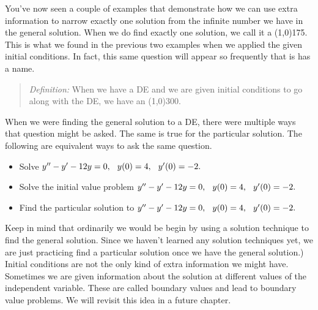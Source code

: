 \documentclass[12pt]{article}
\newcommand{\<}{\langle}
\renewcommand{\>}{\rangle}
\begin{document}
\newpage
	
\noindent  You've now seen a couple of examples that demonstrate how we can use extra information
to narrow exactly one solution from the infinite number we have in the general solution.  When we do
find exactly one solution, we call it a %
\line(1,0){175}.  This is what we found in the previous
two examples when we applied the given initial conditions.  In fact, this same question will appear
so frequently that is has a name.
	\begin{quote}  {\it Definition:}  When we have a DE and we are given initial conditions to go along with the DE,
	we have an %
	\line(1,0){300}.
	\end{quote}
	
\noindent  When we were finding the general solution to a DE, there were multiple ways that question
might be asked.  The same is true for the particular solution.  The following are equivalent ways to ask 
the same question.
\begin{itemize}
\item  Solve $ y'' - y' - 12y = 0, \hspace{0.25cm} y(0) = 4, \hspace{0.25cm} y'(0) = -2. $
\item  Solve  the initial value problem $ y'' - y' - 12y = 0, \hspace{0.25cm} y(0) = 4, \hspace{0.25cm} y'(0) = -2. $
\item  Find the particular solution to $ y'' - y' - 12y = 0, \hspace{0.25cm} y(0) = 4, \hspace{0.25cm} y'(0) = -2. $
\end{itemize}
	
\noindent  Keep in mind that ordinarily
we would be begin by using a solution technique to find the general solution.  Since we 
haven't learned any solution techniques yet, we are just practicing find a particular solution 
once we have the general solution.)\\

\noindent  Initial conditions are not the only kind of extra information we might have.  Sometimes
we are given information about the solution at different values of the independent variable.  These
are called boundary values and lead to boundary value problems.  We will revisit this idea in a
future chapter.\\
\end{document}
